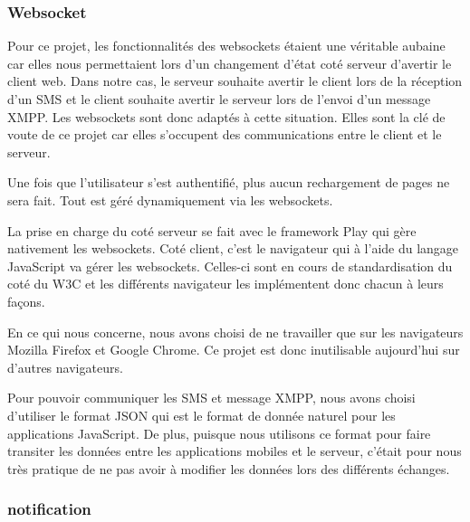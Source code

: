 
\subsubsection{Websocket}

Pour ce projet, les fonctionnalités des websockets étaient une véritable aubaine car elles nous permettaient
lors d'un changement d'état coté serveur d'avertir le client web. Dans notre cas, le serveur souhaite avertir
le client lors de la réception d'un SMS et le client souhaite avertir le serveur lors de l'envoi d'un message
XMPP. Les websockets sont donc adaptés à cette situation. Elles sont la clé de voute de ce projet car elles 
s'occupent des communications entre le client et le serveur.

Une fois que l'utilisateur s'est authentifié, plus aucun rechargement de pages ne sera fait.
Tout est géré 
dynamiquement via les websockets. 

La prise en charge du coté serveur se fait avec le framework Play qui gère nativement les websockets. Coté client,
c'est le navigateur qui à l'aide du langage JavaScript va gérer les websockets. Celles-ci sont en cours de standardisation
du coté du W3C et les différents navigateur les implémentent donc chacun à leurs façons. 

En ce qui nous concerne, nous avons choisi de ne travailler que sur les navigateurs Mozilla Firefox et Google Chrome.
Ce projet est donc inutilisable aujourd'hui sur d'autres navigateurs.

Pour pouvoir communiquer les SMS et message XMPP, nous avons choisi d'utiliser le format JSON qui est le format de
donnée naturel pour les applications JavaScript. De plus, puisque nous utilisons ce format pour faire transiter les
données entre les applications mobiles et le serveur, c'était pour nous très pratique de ne pas avoir à modifier
les données lors des différents échanges.


\subsubsection{notification}

